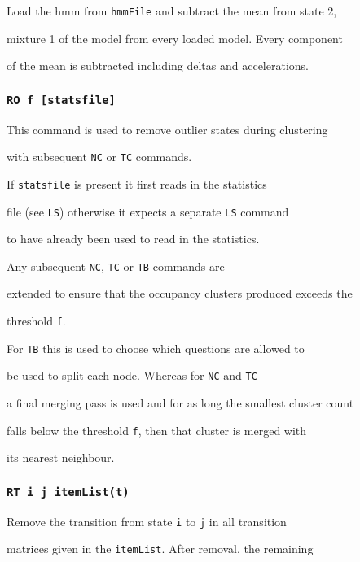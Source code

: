 Load the hmm from \texttt{hmmFile} and subtract the mean from state 2,


mixture 1 of the model from every loaded model.  Every component


of the mean is subtracted including deltas and accelerations.





\subsubsection*{\tt RO f [statsfile]}





This command is used to remove outlier states during clustering


with subsequent \texttt{NC} or \texttt{TC} commands.


If \texttt{statsfile} is present it first reads in the  statistics 


file (see \texttt{LS}) otherwise it expects a separate \texttt{LS} command


to have already been used to read in the statistics.


Any subsequent \texttt{NC}, \texttt{TC} or \texttt{TB} commands are


extended to ensure that the occupancy clusters produced exceeds the 


threshold \texttt{f}.


For \texttt{TB} this is used to choose which questions are allowed to


be used to split each node.   Whereas for \texttt{NC} and \texttt{TC} 


a final merging pass is used and for as long the smallest cluster count 


falls below the threshold \texttt{f}, then that cluster is merged with 


its nearest neighbour.





\subsubsection*{\tt RT i j itemList(t)}





Remove the transition from state \texttt{i} to \texttt{j} in all transition


matrices given in the \texttt{itemList}.  After removal, the remaining


